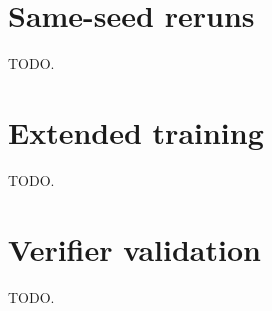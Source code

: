 \section{Same-seed reruns}
\label{app:seeds}
TODO.

\section{Extended training}
\label{app:extended}
TODO.

\section{Verifier validation}
\label{app:verifier}
TODO.
